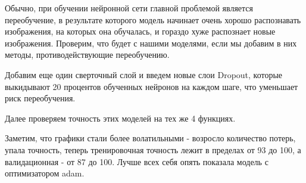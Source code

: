 Обычно, при обучении нейронной сети главной проблемой является переобучение, в результате которого модель начинает очень хорошо распознавать изображения, на которых она обучалась, и гораздо хуже распознает новые изображения. Проверим, что будет с нашими моделями, если мы добавим в них методы, противодействующие переобучению. 

Добавим еще один сверточный слой и введем новые слои Dropout, которые выкидывают 20 процентов обученных нейронов на каждом шаге, что уменьшает риск переобучения.  
\begin{figure}[H]
\end{figure}
Далее проверяем точность этих моделей на тех же 4 функциях.

\begin{figure}[H]
\end{figure}

Заметим, что графики стали более волатильными - возросло количество потерь, упала точность, теперь тренировочная точность лежит в пределах от 93 до 100, а валидационная - от 87 до 100. Лучше всех себя опять показала модель с оптимизатором adam. 
